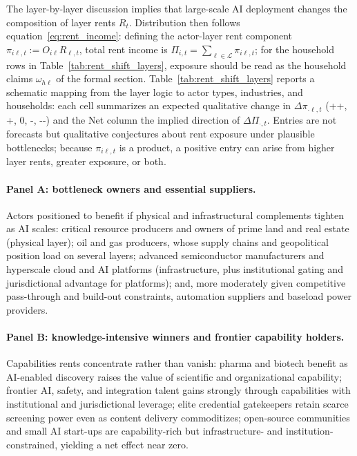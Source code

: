 \documentclass[11pt]{article}
\begin{document}
The layer-by-layer discussion implies that large-scale AI deployment changes the composition of layer rents \(R_t\). Distribution then follows equation~\eqref{eq:rent_income}: defining the actor-layer rent component \(\pi_{i\ell,t}:=O_{i\ell}R_{\ell,t}\), total rent income is \(\Pi_{i,t}=\sum_{\ell\in\mathcal{L}}\pi_{i\ell,t}\); for the household rows in Table~\ref{tab:rent_shift_layers}, exposure should be read as the household claims \(\omega_{h\ell}\) of the formal section. Table~\ref{tab:rent_shift_layers} reports a schematic mapping from the layer logic to actor types, industries, and households: each cell summarizes an expected qualitative change in \(\Delta\pi_{\cdot\ell,t}\) (++, +, 0, -, -{}-) and the Net column the implied direction of \(\Delta\Pi_{\cdot,t}\). Entries are not forecasts but qualitative conjectures about rent exposure under plausible bottlenecks; because \(\pi_{i\ell,t}\) is a product, a positive entry can arise from higher layer rents, greater exposure, or both.

\paragraph{Panel A: bottleneck owners and essential suppliers.}
Actors positioned to benefit if physical and infrastructural complements tighten as AI scales: critical resource producers and owners of prime land and real estate (physical layer); oil and gas producers, whose supply chains and geopolitical position load on several layers; advanced semiconductor manufacturers and hyperscale cloud and AI platforms (infrastructure, plus institutional gating and jurisdictional advantage for platforms); and, more moderately given competitive pass-through and build-out constraints, automation suppliers and baseload power providers.

\paragraph{Panel B: knowledge-intensive winners and frontier capability holders.}
Capabilities rents concentrate rather than vanish: pharma and biotech benefit as AI-enabled discovery raises the value of scientific and organizational capability; frontier AI, safety, and integration talent gains strongly through capabilities with institutional and jurisdictional leverage; elite credential gatekeepers retain scarce screening power even as content delivery commoditizes; open-source communities and small AI start-ups are capability-rich but infrastructure- and institution-constrained, yielding a net effect near zero.
\end{document}
